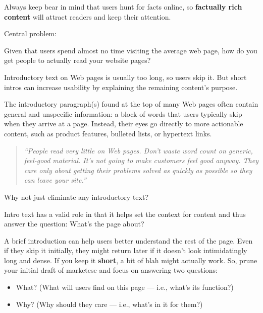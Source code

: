 Always keep bear in mind that users hunt for facts online, so \textbf{factually rich content} will attract readers and keep their attention.

Central problem:

Given that users spend almost no time visiting the average web page, how do you get people to actually read your website pages?

Introductory text on Web pages is usually too long, so users skip it. But short intros can increase usability by explaining the remaining content's purpose.

The introductory paragraph(s) found at the top of many Web pages often contain general and unspecific information: a block of words that users typically skip when they arrive at a page. Instead, their eyes go directly to more actionable content, such as product features, bulleted lists, or hypertext links.

\begin{quote}
\emph{``People read very little on Web pages. Don't waste word count on generic, feel-good material. It's not going to make customers feel good anyway. They care only about getting their problems solved as quickly as possible so they can leave your site.''}~
\end{quote}

Why not just eliminate any introductory text?

Intro text has a valid role in that it helps set the context for content and thus answer the question: What's the page about?

A brief introduction can help users better understand the rest of the page. Even if they skip it initially, they might return later if it doesn't look intimidatingly long and dense. If you keep it \textbf{short}, a bit of blah might actually work. So, prune your initial draft of marketese and focus on answering two questions:

\begin{itemize}
	\item What? (What will users find on this page --- i.e., what's its function?)
	\item Why? (Why should they care --- i.e., what's in it for them?)
\end{itemize}

